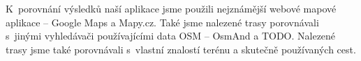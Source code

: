K~porovnání výsledků naší aplikace jsme použili nejznámější webové mapové
aplikace -- Google Maps a Mapy.cz. Také jsme nalezené trasy porovnávali s~jinými
vyhledávači používajícími data OSM -- OsmAnd a TODO. Nalezené trasy jsme také
porovnávali s~vlastní znalostí terénu a skutečně používaných cest.


